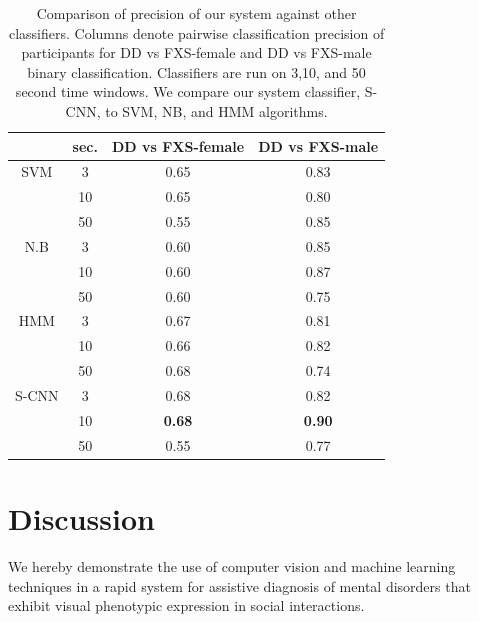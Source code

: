 \documentclass[10pt,twocolumn,letterpaper]{article}
\begin{document}
\begin{table}
\begin{tabular}{c|c|c|c}

                 & sec. & DD vs FXS-female & DD vs FXS-male \\

\hline
SVM  & 3  & 0.65 & 0.83\\
          & 10 & 0.65 & 0.80 \\
          & 50 & 0.55 & 0.85 \\

\hline
N.B   & 3  & 0.60 & 0.85\\
         & 10 & 0.60 & 0.87\\
         & 50 & 0.60 & 0.75\\

\hline
HMM & 3  & 0.67 & 0.81\\ 
    & 10 & 0.66 & 0.82\\
    & 50 & 0.68 & 0.74\\

\Xhline{4\arrayrulewidth}
S-CNN & 3 & 0.68 & 0.82 \\
	     & 10 & \bf{0.68} & \bf{0.90} \\
    	     & 50 & 0.55 & 0.77\\


\end{tabular}
\caption{Comparison of precision of our system against other classifiers. Columns denote pairwise classification precision of participants for DD vs FXS-female and DD vs FXS-male binary classification. Classifiers are run on 3,10, and 50 second time windows. We compare our system classifier, S-CNN, to SVM, NB, and HMM algorithms.}
\label{table:profiler}
\end{table}




\section{Discussion}

We hereby demonstrate the use of computer vision and machine learning techniques in a rapid system for assistive diagnosis of mental disorders that exhibit visual phenotypic expression in social interactions. 
\end{document}
